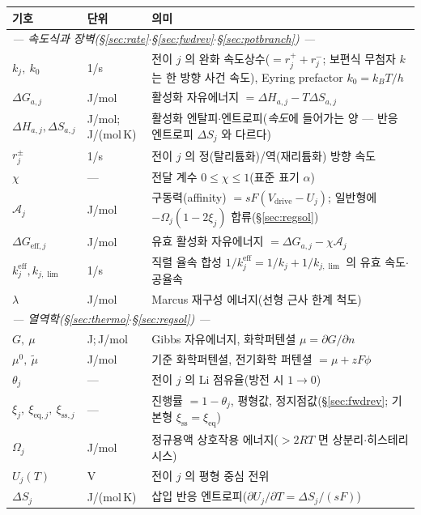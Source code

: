 \documentclass[11pt,a4paper]{article}
\newcommand{\eff}{\mathrm{eff}}
\newcommand{\eq}{\mathrm{eq}}
\newcommand{\drive}{\mathrm{drive}}
\newcommand{\sstat}{\mathrm{ss}}
\begin{document}
\begin{longtable}{p{} p{} p{}}
\toprule 기호 & 단위 & 의미 \\ \midrule \endhead
\multicolumn{3}{l}{\emph{— 속도식과 장벽(\S\ref{sec:rate}$\cdot$\S\ref{sec:fwdrev}$\cdot$\S\ref{sec:potbranch}) —}}\\
$k_j,\ k_0$ & 1/s & 전이 $j$ 의 완화 속도상수($=r_j^++r_j^-$; 보편식 무첨자 $k$ 는 한 방향 사건 속도), Eyring prefactor $k_0=k_BT/h$ \\
$\Delta G_{a,j}$ & J/mol & 활성화 자유에너지 $=\Delta H_{a,j}-T\Delta S_{a,j}$ \\
$\Delta H_{a,j},\Delta S_{a,j}$ & {\footnotesize J/mol;\,J/(mol\,K)} & 활성화 엔탈피$\cdot$엔트로피(\emph{속도}에 들어가는 양 — 반응 엔트로피 $\Delta S_j$ 와 다르다) \\
$r_j^\pm$ & 1/s & 전이 $j$ 의 정(탈리튬화)/역(재리튬화) 방향 속도 \\
$\chi$ & --- & 전달 계수 $0\le\chi\le1$(표준 표기 $\alpha$) \\
$\mathcal A_j$ & J/mol & 구동력(affinity) $=sF(V_\drive-U_j)$; 일반형에 $-\Omega_j(1-2\xi_j)$ 합류(\S\ref{sec:regsol}) \\
$\Delta G_{\eff,j}$ & J/mol & 유효 활성화 자유에너지 $=\Delta G_{a,j}-\chi\mathcal A_j$ \\
$k_j^{\eff},k_{j,\lim}$ & 1/s & 직렬 율속 합성 $1/k_j^{\eff}=1/k_j+1/k_{j,\lim}$ 의 유효 속도$\cdot$공율속 \\
$\lambda$ & J/mol & Marcus 재구성 에너지(선형 근사 한계 척도) \\
\multicolumn{3}{l}{\emph{— 열역학(\S\ref{sec:thermo}$\cdot$\S\ref{sec:regsol}) —}}\\
$G,\ \mu$ & J;\,J/mol & Gibbs 자유에너지, 화학퍼텐셜 $\mu=\partial G/\partial n$ \\
$\mu^0,\ \tilde\mu$ & J/mol & 기준 화학퍼텐셜, 전기화학 퍼텐셜 $=\mu+zF\phi$ \\
$\theta_j$ & --- & 전이 $j$ 의 Li 점유율(방전 시 $1\to0$) \\
$\xi_j,\ \xi_{\eq,j},\ \xi_{\sstat,j}$ & --- & 진행률 $=1-\theta_j$, 평형값, 정지점값(\S\ref{sec:fwdrev}; 기본형 $\xi_{\sstat}=\xi_{\eq}$) \\
$\Omega_j$ & J/mol & 정규용액 상호작용 에너지($>2RT$ 면 상분리$\cdot$히스테리시스) \\
$U_j(T)$ & V & 전이 $j$ 의 평형 중심 전위 \\
$\Delta S_j$ & J/(mol\,K) & 삽입 반응 엔트로피($\partial U_j/\partial T=\Delta S_j/(sF)$) \\

\end{longtable}
\end{document}
